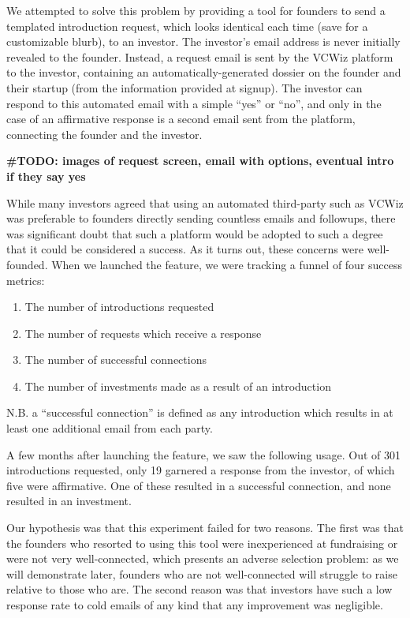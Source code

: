 We attempted to solve this problem by providing a tool for founders to send a templated introduction request, which looks identical each time (save for a customizable blurb), to an investor. The investor's email address is never initially revealed to the founder. Instead, a request email is sent by the VCWiz platform to the investor, containing an automatically-generated dossier on the founder and their startup (from the information provided at signup). The investor can respond to this automated email with a simple ``yes'' or ``no'', and only in the case of an affirmative response is a second email sent from the platform, connecting the founder and the investor.

\textbf{\#TODO: images of request screen, email with options, eventual intro if they say yes}

While many investors agreed that using an automated third-party such as VCWiz was preferable to founders directly sending countless emails and followups, there was significant doubt that such a platform would be adopted to such a degree that it could be considered a success. As it turns out, these concerns were well-founded. When we launched the feature, we were tracking a funnel of four success metrics:

\begin{enumerate}
  \item The number of introductions requested
  \item The number of requests which receive a response
  \item The number of successful connections
  \item The number of investments made as a result of an introduction
\end{enumerate}

N.B. a ``successful connection'' is defined as any introduction which results in at least one additional email from each party.

A few months after launching the feature, we saw the following usage. Out of 301 introductions requested, only 19 garnered a response from the investor, of which five were affirmative. One of these resulted in a successful connection, and none resulted in an investment.

Our hypothesis was that this experiment failed for two reasons. The first was that the founders who resorted to using this tool were inexperienced at fundraising or were not very well-connected, which presents an adverse selection problem: as we will demonstrate later, founders who are not well-connected will struggle to raise relative to those who are. The second reason was that investors have such a low response rate to cold emails of any kind that any improvement was negligible.

